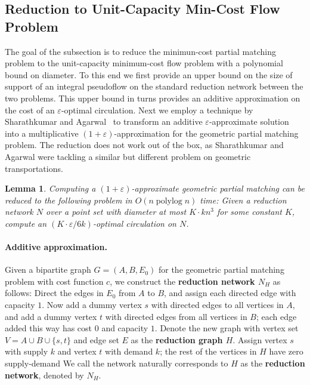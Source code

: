 \documentclass[11pt]{article}
\def\polylog{\mathop{\mathrm{polylog}}}
\def\eps{\varepsilon}
\def\set#1{\{ #1 \}}
\theoremstyle{plain}
\newtheorem{lemma}{Lemma}[section]
\numberwithin{figure}{section}
\def\EMPH#1{\textbf{\boldmath #1}}
\begin{document}


\subsection{Reduction to Unit-Capacity Min-Cost Flow Problem}
\label{SS:reduction}

The goal of the subsection is to reduce the minimun-cost partial matching problem to the unit-capacity minimum-cost flow problem with a polynomial bound on diameter.
To this end we first provide an upper bound on the size of support of an integral pseudoflow on the standard reduction network between the two problems.  This upper bound in turns provides an additive approximation on the cost of an $\eps$-optimal circulation.
Next we employ a technique by Sharathkumar and Agarwal~\cite{SA12} to transform an additive $\eps$-approximate solution into a multiplicative $(1+\eps)$-approximation for the geometric partial matching problem.  The reduction does not work out of the box, as Sharathkumar and Agarwal were tackling a similar but different problem on geometric transportations.

\begin{lemma}
\label{lemma:cost_scale_approx}
Computing a $(1+\eps)$-approximate geometric partial matching can be reduced to the following problem in $O(n \polylog n)$ time:
Given a reduction network $N$ over a point set with diameter at most $K \cdot kn^3$ for some constant $K$, compute an $(K \cdot \eps/6k)$-optimal circulation on $N$.
\end{lemma}


\paragraph{Additive approximation.}
Given a bipartite graph $G = (A,B,E_0)$ for the geometric partial matching problem with cost function $c$, we construct the \EMPH{reduction network $N_H$} as follows:
Direct the edges in $E_0$ from $A$ to $B$, and assign each directed edge with capacity $1$.  Now add a dummy vertex $s$ with directed edges to all vertices in $A$, and add a dummy vertex $t$ with directed edges from all vertices in $B$; each edge added this way has cost $0$ and capacity $1$.
Denote the new graph with vertex set $V = A \cup B \cup \set{s,t}$ and edge set $E$ as the \EMPH{reduction graph $H$}.
Assign vertex $s$ with supply $k$ and vertex $t$ with demand $k$; the rest of the vertices in $H$ have zero supply-demand
We call the network naturally corresponds to $H$ as the \EMPH{reduction network}, denoted by \EMPH{$N_H$}.
\end{document}
